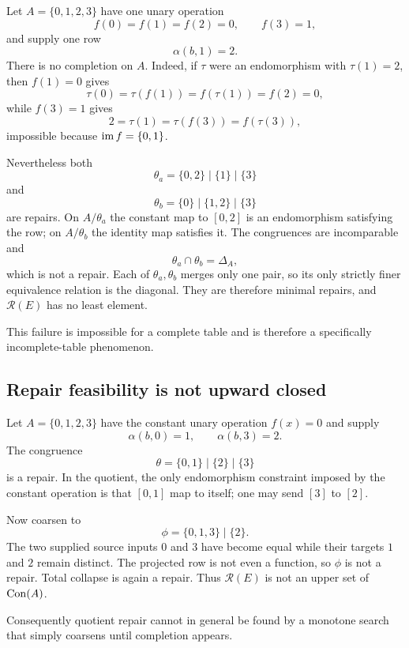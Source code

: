 \begin{example}\label{ex:noleastrepair}
Let $A=\{0,1,2,3\}$ have one unary operation
\[
f(0)=f(1)=f(2)=0,
\qquad
f(3)=1,
\]
and supply one row
\[
\alpha(b,1)=2.
\]
There is no completion on $A$.  Indeed, if $\tau$ were an endomorphism with $\tau(1)=2$, then $f(1)=0$ gives
\[
\tau(0)=\tau(f(1))=f(\tau(1))=f(2)=0,
\]
while $f(3)=1$ gives
\[
2=\tau(1)=\tau(f(3))=f(\tau(3)),
\]
impossible because $\operatorname{im} f=\{0,1\}$.

Nevertheless both
\[
\theta_a=\{0,2\}\mid\{1\}\mid\{3\}
\]
and
\[
\theta_b=\{0\}\mid\{1,2\}\mid\{3\}
\]
are repairs.  On $A/\theta_a$ the constant map to $[0,2]$ is an endomorphism satisfying the row; on $A/\theta_b$ the identity map satisfies it.  The congruences are incomparable and
\[
\theta_a\cap\theta_b=\Delta_A,
\]
which is not a repair. Each of $\theta_a,\theta_b$ merges only one pair,
so its only strictly finer equivalence relation is the diagonal. They are
therefore minimal repairs, and $\mathcal R(E)$ has no least element.
\end{example}

This failure is impossible for a complete table and is therefore a specifically incomplete-table phenomenon.

\subsection{Repair feasibility is not upward closed}

\begin{example}\label{ex:nonmonotone}
Let $A=\{0,1,2,3\}$ have the constant unary operation $f(x)=0$ and supply
\[
\alpha(b,0)=1,
\qquad
\alpha(b,3)=2.
\]
The congruence
\[
\theta=\{0,1\}\mid\{2\}\mid\{3\}
\]
is a repair.  In the quotient, the only endomorphism constraint imposed by the constant operation is that $[0,1]$ map to itself; one may send $[3]$ to $[2]$.

Now coarsen to
\[
\phi=\{0,1,3\}\mid\{2\}.
\]
The two supplied source inputs $0$ and $3$ have become equal while their targets $1$ and $2$ remain distinct.  The projected row is not even a function, so $\phi$ is not a repair.  Total collapse is again a repair.  Thus $\mathcal R(E)$ is not an upper set of $\operatorname{Con}(A)$.
\end{example}

Consequently quotient repair cannot in general be found by a monotone search that simply coarsens until completion appears.


